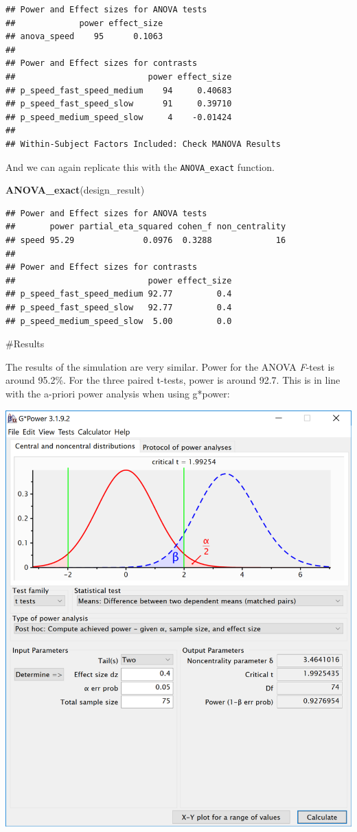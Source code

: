\documentclass[]{book}
\newenvironment{Shaded}{\begin{snugshade}}{\end{snugshade}}
\newcommand{\KeywordTok}[1]{\textcolor[rgb]{0.13,0.29,0.53}{\textbf{#1}}}
\newcommand{\NormalTok}[1]{#1}
\begin{document}
\begin{verbatim}
## Power and Effect sizes for ANOVA tests
##             power effect_size
## anova_speed    95      0.1063
## 
## Power and Effect sizes for contrasts
##                           power effect_size
## p_speed_fast_speed_medium    94     0.40683
## p_speed_fast_speed_slow      91     0.39710
## p_speed_medium_speed_slow     4    -0.01424
## 
## Within-Subject Factors Included: Check MANOVA Results
\end{verbatim}

And we can again replicate this with the \texttt{ANOVA\_exact} function.

\begin{Shaded}
\begin{Highlighting}[]
\KeywordTok{ANOVA_exact}\NormalTok{(design_result)}
\end{Highlighting}
\end{Shaded}

\begin{verbatim}
## Power and Effect sizes for ANOVA tests
##       power partial_eta_squared cohen_f non_centrality
## speed 95.29              0.0976  0.3288             16
## 
## Power and Effect sizes for contrasts
##                           power effect_size
## p_speed_fast_speed_medium 92.77         0.4
## p_speed_fast_speed_slow   92.77         0.4
## p_speed_medium_speed_slow  5.00         0.0
\end{verbatim}

\#Results

The results of the simulation are very similar. Power for the ANOVA \emph{F}-test is around 95.2\%. For the three paired t-tests, power is around 92.7. This is in line with the a-priori power analysis when using g*power:

\includegraphics{screenshots/gpower_2.png}
\end{document}
